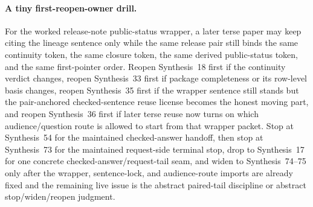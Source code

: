 \documentclass[11pt]{article}
\begin{document}
\paragraph{A tiny first-reopen-owner drill.}
For the worked release-note public-status wrapper, a later terse paper may keep citing the lineage sentence only while the same release pair still binds the same continuity token, the same closure token, the same derived public-status token, and the same first-pointer order. Reopen Synthesis~18 first if the continuity verdict changes, reopen Synthesis~33 first if package completeness or its row-level basis changes, reopen Synthesis~35 first if the wrapper sentence still stands but the pair-anchored checked-sentence reuse license becomes the honest moving part, and reopen Synthesis~36 first if later terse reuse now turns on which audience/question route is allowed to start from that wrapper packet. Stop at Synthesis~54 for the maintained checked-answer handoff, then stop at Synthesis~73 for the maintained request-side terminal stop, drop to Synthesis~17 for one concrete checked-answer/request-tail seam, and widen to Synthesis~74--75 only after the wrapper, sentence-lock, and audience-route imports are already fixed and the remaining live issue is the abstract paired-tail discipline or abstract stop/widen/reopen judgment.\cite{series:workedexample,series:planstateequiv,series:releaseclosure,series:sentencelocks,series:challengeroutes,series:challengeanswerreviewmenus,series:pairedterminalcitationdiscipline,series:pairedterminalcutoverrules}
\end{document}
